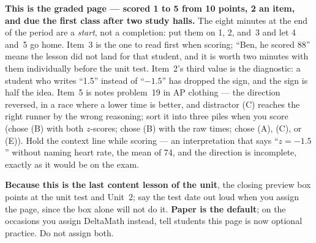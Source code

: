 \documentclass[10pt]{article}
\begin{document}
\begin{teachernote}[Homework]
\textbf{This is the graded page --- scored 1 to 5 from 10 points, 2 an item, and due the first class
after two study halls.} The eight minutes at the end of the period are a \emph{start}, not a
completion: put them on 1, 2, and~3 and let 4 and~5 go home. Item~3 is the one to read first when
scoring; ``Ben, he scored 88'' means the lesson did not land for that student, and it is worth two
minutes with them individually before the unit test. Item~2's third value is the diagnostic: a
student who writes ``1.5'' instead of ``$-1.5$'' has dropped the sign, and the sign is half the
idea. Item~5 is notes problem~19 in AP clothing --- the direction reversed, in a race where a
lower time is better, and distractor (C) reaches the right runner by the wrong reasoning; sort it
into three piles when you score (chose (B) with both $z$-scores; chose (B) with the raw times;
chose (A), (C), or (E)). Hold the context line while scoring --- an interpretation that says
``$z = -1.5$'' without naming heart rate, the mean of 74, and the direction is incomplete,
exactly as it would be on the exam.

\textbf{Because this is the last content lesson of the unit}, the closing preview box points at
the unit test and Unit~2; say the test date out loud when you assign the page, since the box alone
will not do it. \textbf{Paper is the default}; on the occasions you assign DeltaMath instead,
tell students this page is now optional practice. Do not
assign both.
\end{teachernote}
\end{document}
